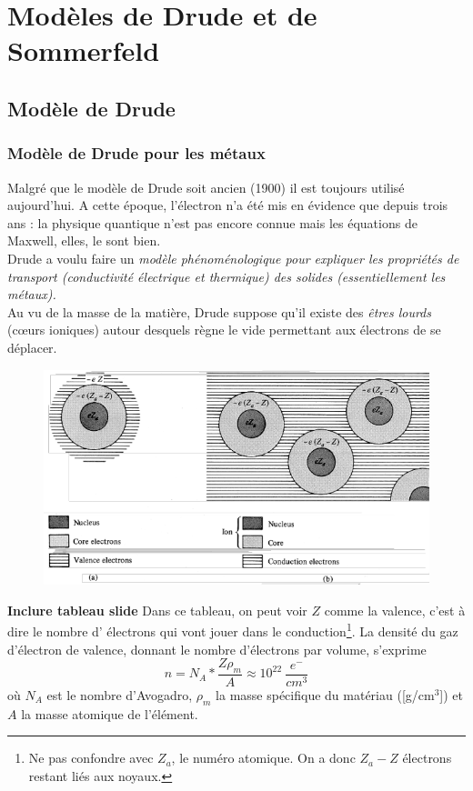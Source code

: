 \setcounter{chapter}{1}
\chapter{Modèles de Drude et de Sommerfeld}
\section{Modèle de Drude}
	\subsection{Modèle de Drude pour les métaux}
	Malgré que le modèle de Drude soit ancien (1900) il est toujours utilisé 
	aujourd'hui. A cette époque, l'électron n'a été mis en évidence que depuis 
	trois ans : la physique quantique n'est pas encore connue mais les équations 
	de Maxwell, elles, le sont bien.\\
	Drude a voulu faire un \textit{modèle phénoménologique pour expliquer 
	les propriétés de transport (conductivité électrique et thermique) des solides 
	(essentiellement les métaux).}\\
	
	\noindent	
	Au vu de la masse de la matière, Drude suppose qu'il existe des \textit{êtres 
	lourds} (cœurs ioniques) autour desquels règne le vide permettant aux électrons 
	de se déplacer.
	
	\begin{figure}
	\includegraphics[scale=0.3]{ch1/image1.png}
	\end{figure}
	\noindent
	\textbf{	Inclure tableau slide}
	Dans ce tableau, on peut voir $Z$ comme la valence, c'est à dire le nombre d'
	électrons qui vont jouer dans le conduction\footnote{Ne pas confondre avec $Z_a$, 
	le numéro atomique. On a donc $Z_a-Z$ électrons restant liés aux noyaux.}. La 
	densité du gaz d'électron de valence, donnant le nombre d'électrons par volume, 
	s'exprime 
	\begin{equation}
	n = N_A * \dfrac{Z\rho_m}{A} \approx 10^{22}\ \frac{e^-}{cm^3}
	\end{equation}
	où $N_A$ est le nombre d’Avogadro, $\rho_m$ la masse spécifique du matériau 
	([g/cm$^3$]) et $A$ la masse atomique de l'élément.
	
